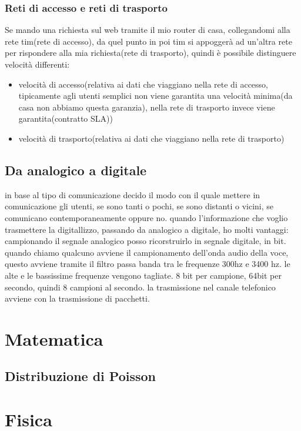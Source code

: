 \subsubsection{Reti di accesso e reti di trasporto}
Se mando una richiesta sul web tramite il mio router di casa, collegandomi alla rete tim(rete di accesso), da quel punto in poi tim si appoggerà ad un’altra rete per rispondere alla mia richiesta(rete di trasporto), quindi è possibile distinguere velocità differenti: 
\begin{itemize}
    \item velocità di accesso(relativa ai dati che viaggiano nella rete di accesso, tipicamente agli utenti semplici non viene garantita una velocità minima(da casa non abbiamo questa garanzia), nella rete di trasporto invece viene garantita(contratto SLA))
    \item velocità di trasporto(relativa ai dati che viaggiano nella rete di trasporto)
\end{itemize}

\subsection{Da analogico a digitale}
in base al tipo di comunicazione decido il modo con il quale mettere in comunicazione gli utenti, se sono tanti o pochi, se sono distanti o vicini, se comunicano contemporaneamente oppure no.
quando l’informazione che voglio trasmettere la digitallizzo, passando da analogico a digitale, ho molti vantaggi:
campionando il segnale analogico posso ricorstruirlo in segnale digitale, in bit.
quando chiamo qualcuno avviene il campionamento dell’onda audio della voce, questo avviene tramite il filtro passa banda tra le frequenze 300hz e 3400 hz. le alte e le bassissime frequenze vengono tagliate. 8 bit per campione, 64bit per secondo, quindi 8 campioni al secondo. la trasmissione nel canale telefonico avviene con la trasmissione di pacchetti.


\newpage
\section{Matematica}
\subsection{Distribuzione di Poisson}
\section{Fisica}
